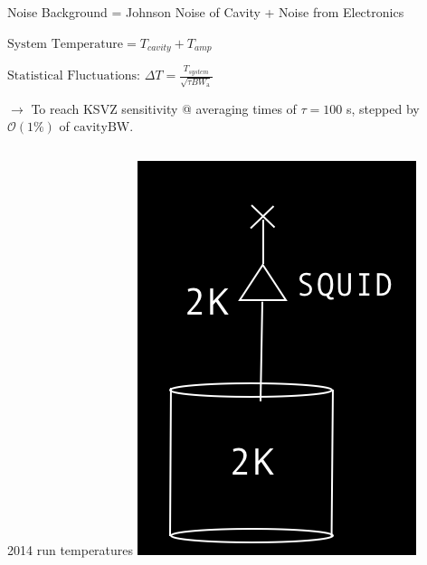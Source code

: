 \documentclass{beamer}
\begin{document}
\begin{frame}{Noise}
{\tiny Background = Johnson Noise of Cavity + Noise from Electronics}
\begin{center}
$\text{System Temperature} = T_{cavity} + T_{amp}$

$\text{Statistical Fluctuations: } \Delta T = \frac{T_{system}}{\sqrt{\tau BW_{\text{a}}}}$
\end{center}

 {\tiny $\rightarrow$ To reach KSVZ sensitivity @ averaging times of $\tau = 100$ s, stepped by $\mathcal{O}(1\%)$ of $\text{cavityBW}$.}
 
 \begin{columns}
{\tiny {\color{blue} 2014 run temperatures}}
\includegraphics[width=\textwidth]{dark_2K}

\end{columns}
\end{frame}
\end{document}
